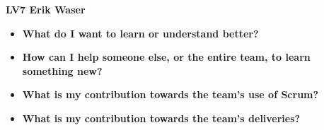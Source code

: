 \documentclass[]{article}
\begin{document}
\textbf{\huge{LV7} Erik Waser}

\begin{itemize}
    \item \textbf{What do I want to learn or understand better?} \newline
    
    
    \item \textbf{How can I help someone else, or the entire team, to learn something new?} \newline
    
    
    \item \textbf{What is my contribution towards the team’s use of Scrum?} \newline
    
    
    \item \textbf{What is my contribution towards the team’s deliveries?} \newline
    
 
\end{itemize}
\end{document}
